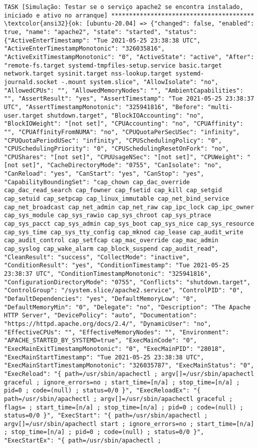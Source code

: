 \documentclass{scrartcl}
\begin{document}
\begin{Verbatim}
TASK [Simulação: Testar se o serviço apache2 se encontra instalado, iniciado e ativo no arranque] ****************************************
\textcolor{ansi32}{ok: [ubuntu-20.04] => {"changed": false, "enabled": true, "name": "apache2", "state": "started", "status": {"ActiveEnterTimestamp": "Tue 2021-05-25 23:38:38 UTC", "ActiveEnterTimestampMonotonic": "326035816", "ActiveExitTimestampMonotonic": "0", "ActiveState": "active", "After": "remote-fs.target systemd-tmpfiles-setup.service basic.target network.target sysinit.target nss-lookup.target systemd-journald.socket -.mount system.slice", "AllowIsolate": "no", "AllowedCPUs": "", "AllowedMemoryNodes": "", "AmbientCapabilities": "", "AssertResult": "yes", "AssertTimestamp": "Tue 2021-05-25 23:38:37 UTC", "AssertTimestampMonotonic": "325941816", "Before": "multi-user.target shutdown.target", "BlockIOAccounting": "no", "BlockIOWeight": "[not set]", "CPUAccounting": "no", "CPUAffinity": "", "CPUAffinityFromNUMA": "no", "CPUQuotaPerSecUSec": "infinity", "CPUQuotaPeriodUSec": "infinity", "CPUSchedulingPolicy": "0", "CPUSchedulingPriority": "0", "CPUSchedulingResetOnFork": "no", "CPUShares": "[not set]", "CPUUsageNSec": "[not set]", "CPUWeight": "[not set]", "CacheDirectoryMode": "0755", "CanIsolate": "no", "CanReload": "yes", "CanStart": "yes", "CanStop": "yes", "CapabilityBoundingSet": "cap_chown cap_dac_override cap_dac_read_search cap_fowner cap_fsetid cap_kill cap_setgid cap_setuid cap_setpcap cap_linux_immutable cap_net_bind_service cap_net_broadcast cap_net_admin cap_net_raw cap_ipc_lock cap_ipc_owner cap_sys_module cap_sys_rawio cap_sys_chroot cap_sys_ptrace cap_sys_pacct cap_sys_admin cap_sys_boot cap_sys_nice cap_sys_resource cap_sys_time cap_sys_tty_config cap_mknod cap_lease cap_audit_write cap_audit_control cap_setfcap cap_mac_override cap_mac_admin cap_syslog cap_wake_alarm cap_block_suspend cap_audit_read", "CleanResult": "success", "CollectMode": "inactive", "ConditionResult": "yes", "ConditionTimestamp": "Tue 2021-05-25 23:38:37 UTC", "ConditionTimestampMonotonic": "325941816", "ConfigurationDirectoryMode": "0755", "Conflicts": "shutdown.target", "ControlGroup": "/system.slice/apache2.service", "ControlPID": "0", "DefaultDependencies": "yes", "DefaultMemoryLow": "0", "DefaultMemoryMin": "0", "Delegate": "no", "Description": "The Apache HTTP Server", "DevicePolicy": "auto", "Documentation": "https://httpd.apache.org/docs/2.4/", "DynamicUser": "no", "EffectiveCPUs": "", "EffectiveMemoryNodes": "", "Environment": "APACHE_STARTED_BY_SYSTEMD=true", "ExecMainCode": "0", "ExecMainExitTimestampMonotonic": "0", "ExecMainPID": "28018", "ExecMainStartTimestamp": "Tue 2021-05-25 23:38:38 UTC", "ExecMainStartTimestampMonotonic": "326035787", "ExecMainStatus": "0", "ExecReload": "{ path=/usr/sbin/apachectl ; argv[]=/usr/sbin/apachectl graceful ; ignore_errors=no ; start_time=[n/a] ; stop_time=[n/a] ; pid=0 ; code=(null) ; status=0/0 }", "ExecReloadEx": "{ path=/usr/sbin/apachectl ; argv[]=/usr/sbin/apachectl graceful ; flags= ; start_time=[n/a] ; stop_time=[n/a] ; pid=0 ; code=(null) ; status=0/0 }", "ExecStart": "{ path=/usr/sbin/apachectl ; argv[]=/usr/sbin/apachectl start ; ignore_errors=no ; start_time=[n/a] ; stop_time=[n/a] ; pid=0 ; code=(null) ; status=0/0 }", "ExecStartEx": "{ path=/usr/sbin/apachectl ; 
\end{Verbatim}
\end{document}
